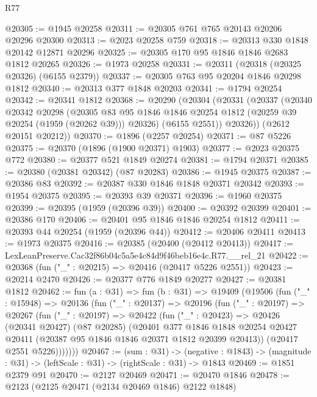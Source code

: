\begin{lexlean}{R77}
\begin{coremodule}
@20305 := @1945 @20258
@20311 := @20305 @761 @765 @20143 @20206 @20296 @20300
@20313 := @2023 @20258 @759
@20318 := @20313 @330 @1848 @20142 @12871 @20296
@20325 := @20305 @170 @95 @1846 @1846 @2683 @1812 @20265
@20326 := @1973 @20258
@20331 := @20311 (@20318 (@20325 @20326) (@6155 @2379))
@20337 := @20305 @763 @95 @20204 @1846 @20298 @1812
@20340 := @20313 @377 @1848 @20203
@20341 := @1794 @20254
@20342 := @20341 @1812
@20368 := @20290
    (@20304
      (@20331
        (@20337
          (@20340
            @20342
            @20298
            (@20305
              @83
              @95
              @1846
              @1846
              @20254
              @1812
              (@20259 @39 @20254 (@1959 (@20262 @39)))
              @20326)
            (@6155 @2551))
          @20326))
      (@2612 @20151 @20212))
@20370 := @1896 (@2257 @20254)
@20371 := @87 @5226
@20375 := @20370 (@1896 (@1900 @20371) @1903)
@20377 := @2023 @20375 @772
@20380 := @20377 @521 @1849 @20274
@20381 := @1794 @20371
@20385 := @20380 (@20381 @20342) (@87 @20283)
@20386 := @1945 @20375
@20387 := @20386 @83
@20392 := @20387 @330 @1846 @1848 @20371 @20342
@20393 := @1954 @20375
@20395 := @20393 @39 @20371
@20396 := @1960 @20375
@20399 := @20395 (@1959 (@20396 @39))
@20400 := @20392 @20399
@20401 := @20386 @170
@20406 := @20401 @95 @1846 @1846 @20254 @1812
@20411 := @20393 @44 @20254 (@1959 (@20396 @44))
@20412 := @20406 @20411
@20413 := @1973 @20375
@20416 := @20385 (@20400 (@20412 @20413))
@20417 := LexLeanPreserve.Cac32f86b04c5a5e4c84d9f46beb16e4c.R77.__rel_21
@20422 := @20368 (fun ("_" : @20215) => @20416 (@20417 @5226 @2551))
@20423 := @20214 @2470
@20426 := @20377 @776 @1849 @20277
@20427 := @20381 @1812
@20462 := fun (a : @31) =>
  fun (b : @31) =>
  @19409
    (@19506
      (fun ("_" : @15948) =>
      @20136
        (fun ("_" : @20137) =>
        @20196
          (fun ("_" : @20197) =>
          @20267
            (fun ("_" : @20197) =>
            @20422
              (fun ("_" : @20423) =>
              @20426
                (@20341 @20427)
                (@87 @20285)
                (@20401
                  @377
                  @1846
                  @1848
                  @20254
                  @20427
                  @20411
                  (@20387 @95 @1846 @1846 @20371 @1812 @20399 @20413))
                (@20417 @2551 @5226)))))))
@20467 := (sum : @31) ->
  (negative : @1843) -> (magnitude : @31) -> (leftScale : @31) -> (rightScale : @31) -> @1843
@20469 := @1851 @2379 @91
@20470 := @2127 @20469
@20471 := @20470 @1846
@20478 := @2123 (@2125 @20471 (@2134 @20469 @1846) @2122 @1848)

\end{coremodule}
\end{lexlean}
